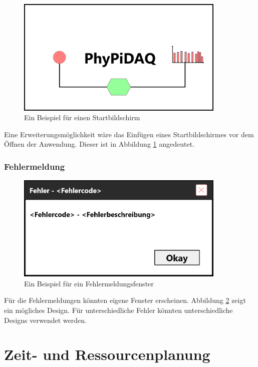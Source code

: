 \documentclass[parskip=full]{scrartcl}
\begin{document}
\begin{figure}[h]
	\begin{center}
		\includegraphics[width = 10cm]{Grafik/Startbildschirm.png}
		\caption{Ein Beispiel für einen Startbildschirm}
		\label{startbildschirm}
	\end{center}
\end{figure}

Eine Erweiterungsmöglichkeit wäre das Einfügen eines Startbildschirmes vor dem Öffnen der Anwendung. Dieser ist in Abbildung \ref{startbildschirm} angedeutet.

\subsubsection{Fehlermeldung}

\begin{figure}[h]
	\begin{center}
		\includegraphics[width = 10cm]{Grafik/Fehlerfenster}
		\caption{Ein Beispiel für ein Fehlermeldungsfenster}
		\label{fehlerfenster}
	\end{center}
\end{figure}

Für die Fehlermeldungen könnten eigene Fenster erscheinen. Abbildung \ref{fehlerfenster} zeigt ein mögliches Design. Für unterschiedliche Fehler könnten unterschiedliche Designs verwendet werden.

\clearpage
\section{Zeit- und Ressourcenplanung}\label{zeit}
\end{document}
